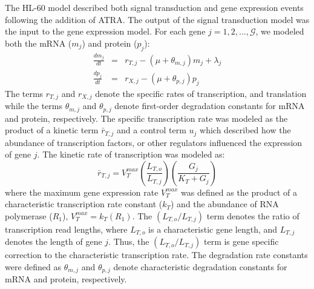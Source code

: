 \documentclass[12pt]{article}
\begin{document}
The HL-60 model described both signal transduction and gene expression events following the addition of ATRA.
The output of the signal transduction model was the input to the gene expression model.
For each gene $j=1,2,\dots,\mathcal{G}$, we modeled both the mRNA ($m_{j}$) and protein ($p_{j}$):
\begin{eqnarray}
	\frac{dm_{j}}{dt} &=& r_{T,j} - \left(\mu+\theta_{m,j}\right)m_{j}+\lambda_{j}\\
	\frac{dp_{j}}{dt} &=& r_{X,j} - \left(\mu+\theta_{p,j}\right)p_{j}
\end{eqnarray}
The terms $r_{T,j}$ and $r_{X,j}$ denote the specific rates of transcription, and translation while
the terms $\theta_{m,j}$ and $\theta_{p,j}$ denote first-order degradation constants for mRNA and protein, respectively.
The specific transcription rate was modeled as the product of a kinetic term $\bar{r}_{T,j}$ and a control term $u_{j}$ which described how the
abundance of transcription factors, or other regulators influenced the expression of gene $j$.
The kinetic rate of transcription was modeled as:
\begin{equation}
	\bar{r}_{T,j} = V^{max}_{T}\left(\frac{L_{T,o}}{L_{T,j}}\right)\left(\frac{G_{j}}{K_{T}+G_{j}}\right)
\end{equation}where the maximum gene expression rate $V^{max}_{T}$ was defined as the product of a characteristic transcription rate constant ($k_{T}$)
and the abundance of RNA polymerase ($R_{1}$), $V^{max}_{T} = k_{T}\left(R_{1}\right)$. The $\left(L_{T,o}/L_{T,j}\right)$ term denotes the ratio of transcription read lengths,
where $L_{T,o}$ is a characteristic gene length, and $L_{T,j}$ denotes the length of gene $j$.
Thus, the $\left(L_{T,o}/L_{T,j}\right)$ term is gene specific correction to the characteristic transcription rate.
The degradation rate constants were defined as $\theta_{m,j}$ and $\theta_{p,j}$ denote characteristic degradation constants for mRNA and protein, respectively.
\end{document}
